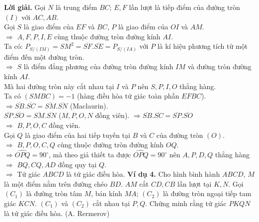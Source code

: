 \documentclass[12pt,a4paper]{article}
\begin{document}
\textbf{Lời giải.} Gọi \(N\) là trung điểm \(BC\); \(E, F\) lần lượt là tiếp điểm của đường tròn \(\left( I \right)\) với \(AC, AB\).\\
Gọi \(S\) là giao điểm của \(EF\) và \(BC\), \(P\) là giao điểm của \(OI\) và \(AM\). \\
\( \Rightarrow \) \(A, F, P, I, E\) cùng thuộc đường tròn đường kính \(AI\).\\
Ta có: \({P_{S/\left( {IM} \right)}} = S{M^2} = \overline {SF} .\overline {SE}  = {P_{S/\left( {IA} \right)}}\) với \(P\) là kí hiệu phương tích từ một điểm đến một đường tròn.\\
\( \Rightarrow \) \(S\) là điểm đẳng phương của đường tròn đường kính \(IM\) và đường tròn đường kính \(AI\).\\
Mà hai đường tròn này cắt nhau tại \(I\) và \(P\) nên \(S, P, I, O\) thẳng hàng.\\
Ta có \(\left( {SMBC} \right) =  - 1\) (hàng điều hòa tứ giác toàn phần \(EFBC\)).\\
\( \Rightarrow \overline {SB} .\overline {SC}  = \overline {SM} .\overline {SN} \) (Maclaurin).\\
\(\overline {SP} .\overline {SO}  = \overline {SM} .\overline {SN} \) (\(M, P, O, N\) đồng viên).
\( \Rightarrow \overline {SB} .\overline {SC}  = \overline {SP} .\overline {SO} \)\\
\( \Rightarrow \) \(B, P, O, C\) đồng viên.\\
Gọi \(Q\) là giao điểm của hai tiếp tuyến tại \(B\) và \(C\) của đường tròn \(\left( O \right)\).\\
\( \Rightarrow \) \(B, P, O, C, Q\) cùng thuộc đường tròn đường kính \(OQ\).\\
\( \Rightarrow \widehat {OPQ} = {90^ \circ }\), mà theo giả thiết ta được \(\widehat {OPQ} = {90^ \circ }\) nên \(A, P, D, Q\) thẳng hàng \( \Rightarrow \) \(BQ, CQ, AD\) đồng quy tại \(Q\).\\
\( \Rightarrow \) Tứ giác \(ABCD\) là tứ giác điều hòa.
\newpage
\textbf{Ví dụ 4.} Cho hình bình hành \(ABCD\), \(M\) là một điểm nằm trên đường chéo \(BD\). \(AM\) cắt \(CD, CB\) lần lượt tại \(K, N\). Gọi \(\left( {{C_1}} \right)\) là đường tròn tâm \(M\), bán kính \(MA\); \(\left( {{C_2}} \right)\) là đường tròn ngoại tiếp tam giác \(KCN\). \(\left( {{C_1}} \right)\) và \(\left( {{C_2}} \right)\) cắt nhau tại \(P, Q\). Chứng minh rằng tứ giác \(PKQN\) là tứ giác điều hòa. (A. Rermerov)\\
\end{document}

